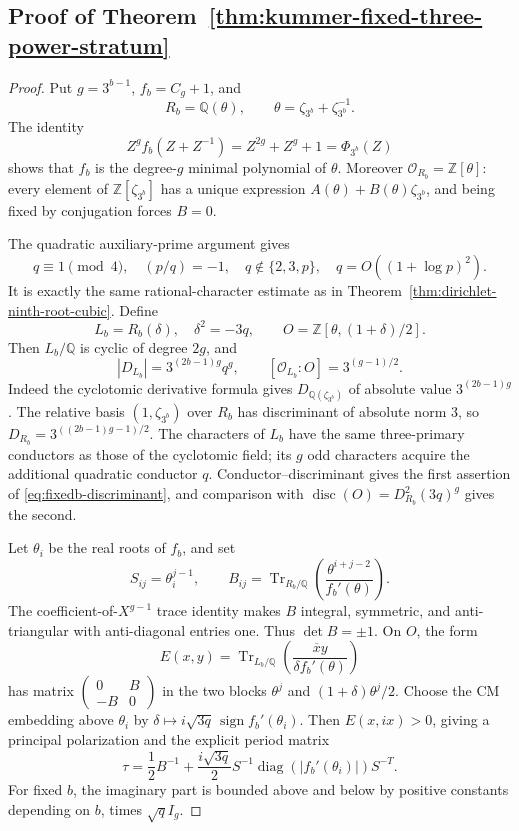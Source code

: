 \documentclass[11pt]{article}
\theoremstyle{definition}
\theoremstyle{remark}
\begin{document}
\subsection*{Proof of Theorem~\ref{thm:kummer-fixed-three-power-stratum}}
\begin{proof}
Put \(g=3^{b-1}\), \(f_b=C_g+1\), and
\[
 R_b=\mathbb Q(\theta),\qquad
 \theta=\zeta_{3^b}+\zeta_{3^b}^{-1}.
\]
The identity
\[
 Z^g f_b(Z+Z^{-1})=Z^{2g}+Z^g+1=\Phi_{3^b}(Z)
\]
shows that \(f_b\) is the degree-\(g\) minimal polynomial
of \(\theta\). Moreover \(\mathcal O_{R_b}=\mathbb Z[\theta]\):
every element of \(\mathbb Z[\zeta_{3^b}]\) has a unique
expression \(A(\theta)+B(\theta)\zeta_{3^b}\), and being
fixed by conjugation forces \(B=0\).

The quadratic auxiliary-prime argument gives
\[
 q\equiv1\pmod4,\quad (p/q)=-1,\quad
 q\notin\{2,3,p\},\quad q=O((1+\log p)^2).
\]
It is exactly the same rational-character estimate as in
Theorem~\ref{thm:dirichlet-ninth-root-cubic}. Define
\[
 L_b=R_b(\delta),\quad \delta^2=-3q,\qquad
 O=\mathbb Z[\theta,(1+\delta)/2].
\]
Then \(L_b/\mathbb Q\) is cyclic of degree \(2g\), and
\[
 |D_{L_b}|=3^{(2b-1)g}q^g,\qquad
 [\mathcal O_{L_b}:O]=3^{(g-1)/2}.                 \label{eq:fixedb-discriminant}
\]
Indeed the cyclotomic derivative formula gives
\(D_{\mathbb Q(\zeta_{3^b})}\) of absolute value
\(3^{(2b-1)g}\). The relative basis \((1,\zeta_{3^b})\)
over \(R_b\) has discriminant of absolute norm \(3\), so
\(D_{R_b}=3^{((2b-1)g-1)/2}\). The characters of \(L_b\)
have the same three-primary conductors as those of the
cyclotomic field; its \(g\) odd characters acquire the
additional quadratic conductor \(q\). Conductor--discriminant
gives the first assertion of \eqref{eq:fixedb-discriminant}, and comparison with
\(\operatorname{disc}(O)=D_{R_b}^2(3q)^g\) gives the second.

Let \(\theta_i\) be the real roots of \(f_b\), and set
\[
 S_{ij}=\theta_i^{j-1},\qquad
 B_{ij}=\operatorname{Tr}_{R_b/\mathbb Q}
       \left(\frac{\theta^{i+j-2}}{f_b'(\theta)}\right).
\]
The coefficient-of-\(X^{g-1}\) trace identity makes \(B\)
integral, symmetric, and anti-triangular with anti-diagonal
entries one. Thus \(\det B=\pm1\). On \(O\), the form
\[
 E(x,y)=\operatorname{Tr}_{L_b/\mathbb Q}
       \left(\frac{\overline{x}y}{\delta f_b'(\theta)}\right)
\]
has matrix \(\left(\begin{smallmatrix}0&B\\-B&0\end{smallmatrix}\right)\)
in the two blocks \(\theta^j\) and
\((1+\delta)\theta^j/2\). Choose the CM embedding above
\(\theta_i\) by
\(\delta\mapsto i\sqrt{3q}\,\operatorname{sign}f_b'(\theta_i)\).
Then \(E(x,ix)>0\), giving a principal polarization and the
explicit period matrix
\[
 \tau=\frac12 B^{-1}
   +\frac{i\sqrt{3q}}2 S^{-1}
      \operatorname{diag}(|f_b'(\theta_i)|)S^{-T}.       \label{eq:fixedb-periods}
\]
For fixed \(b\), the imaginary part is bounded above and
below by positive constants depending on \(b\), times
\(\sqrt q I_g\).


\end{proof}
\end{document}

